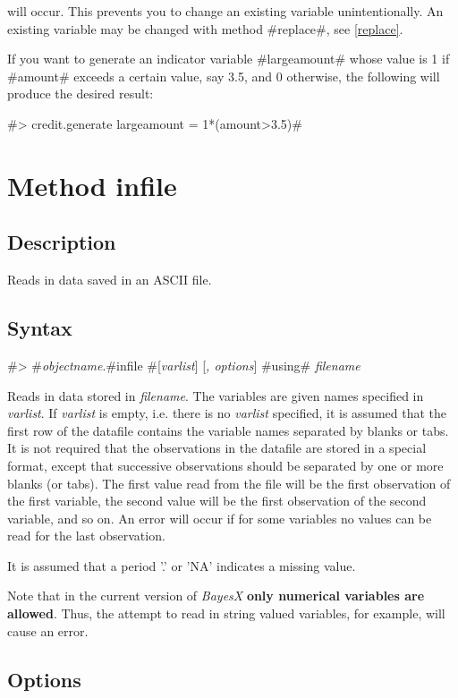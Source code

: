 will occur. This prevents you to change an existing variable
unintentionally. An existing variable may be changed with method
#replace#, see \autoref{replace}.

If you want to generate an indicator variable #largeamount# whose
value is 1 if #amount# exceeds a certain value, say 3.5, and 0
otherwise, the following will
produce the desired result:

#> credit.generate largeamount = 1*(amount>3.5)#


\section{Method infile}
\label{infile} 


\subsection*{Description}

Reads in data saved in an ASCII file.


\subsection*{Syntax}

#> #{\em objectname}.#infile #[{\em varlist}] [{\em , options}] #using# {\em filename}

Reads in data stored in {\em filename}. The variables are given
names specified in {\em varlist}. If {\em varlist} is empty, i.e.
there is no {\em varlist} specified, it is assumed that the first
row of the datafile contains the variable names separated by
blanks or tabs. It is not required that the observations in the
datafile are stored in a special format, except that successive
observations should be separated by one or more blanks (or tabs).
The first value read from the file will be the first observation
of the first variable, the second value will be the first
observation of the second variable, and so on. An error will occur
if for some variables no values can be read for the last
observation.

It is assumed that  a period '.' or 'NA' indicates a missing
value.

Note that in the current version of {\em BayesX} {\bf only
numerical variables are allowed}. Thus, the attempt to read in
string valued variables, for example, will cause an error.


\subsection*{Options}

